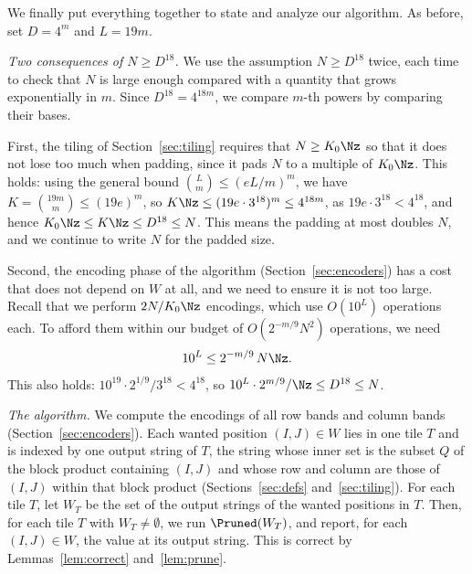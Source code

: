 We finally put everything together to state and analyze our algorithm. As before, set $D=4^m$ and $L=19m$.

\emph{Two consequences of $N\ge D^{18}$.} We use the assumption $N\ge D^{18}$ twice, each time to check that $N$ is large enough compared with a quantity that grows exponentially in $m$. Since $D^{18}=4^{18m}$, we compare $m$-th powers by comparing their bases. 

First, the tiling of Section~\ref{sec:tiling} requires that $N\ge K_0\Nz$ so that it does not lose too much when padding, since it pads $N$ to a multiple of $K_0\Nz$. This holds: using the general bound $\binom Lm\le(eL/m)^m$, we have $K=\binom{19m}m\le(19e)^m$, so $K\Nz\le(19e\cdot3^{18})^m\le4^{18m}$, as $19e\cdot3^{18}<4^{18}$, and hence $K_0\Nz\le K\Nz\le D^{18}\le N$. This means the padding at most doubles $N$, and we continue to write $N$ for the padded size. 

Second, the encoding phase of the algorithm (Section~\ref{sec:encoders}) has a cost that does not depend on $W$ at all, and we need to ensure it is not too large. Recall that we perform $2N/K_0\Nz$ encodings, which use $O(10^L)$ operations each. To afford them within our budget of $O(2^{-m/9}N^2)$ operations, we need \begin{equation}\label{eq:enchyp}
10^L\le2^{-m/9}\,N\Nz.
\end{equation} This also holds: $10^{19}\cdot2^{1/9}/3^{18}<4^{18}$, so $10^L\cdot2^{m/9}/\Nz\le D^{18}\le N$.


\emph{The algorithm.} We compute the encodings of all row bands and column bands (Section~\ref{sec:encoders}). Each wanted position $(I,J)\in W$ lies in one tile $T$ and is indexed by one output string of $T$, the string whose inner set is the subset $Q$ of the block product containing $(I,J)$ and whose row and column are those of $(I,J)$ within that block product (Sections~\ref{sec:defs} and~\ref{sec:tiling}). For each tile $T$, let $W_T$ be the set of the output strings of the wanted positions in $T$. Then, for each tile $T$ with $W_T\ne\emptyset$, we run $\Pruned(W_T)$, and report, for each $(I,J)\in W$, the value at its output string. This is correct by Lemmas~\ref{lem:correct} and~\ref{lem:prune}.


